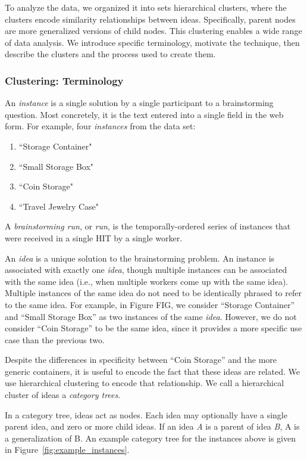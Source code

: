 To analyze the data, we organized it into sets hierarchical clusters, where the clusters encode similarity relationships between ideas. Specifically, parent nodes are more generalized versions of child nodes. This clustering enables a wide range of data analysis. We introduce specific terminology, motivate the technique, then describe the clusters and the process used to create them.

\subsubsection{Clustering: Terminology}
An \emph{instance} is a single solution by a single participant to a brainstorming question. Most concretely, it is the text entered into a single field in the web form. For example, four \emph{instances} from the data set:

\begin{enumerate}
    \item ``Storage Container"
    \item ``Small Storage Box"
    \item ``Coin Storage"
    \item ``Travel Jewelry Case"
\end{enumerate}

A \emph{brainstorming run}, or \emph{run}, is the temporally-ordered series of instances that were received in a single HIT by a single worker.

An \emph{idea} is a unique solution to the brainstorming problem. An instance is associated with exactly one \emph{idea}, though multiple instances can be associated with the same idea (i.e., when multiple workers come up with the same idea). Multiple instances of the same idea do not need to be identically phrased to refer to the same idea. For example, in Figure FIG, we consider ``Storage Container'' and ``Small Storage Box'' as two instances of the same \emph{idea}. However, we do not consider ``Coin Storage'' to be the same idea, since it provides a more specific use case than the previous two.

Despite the differences in specificity between ``Coin Storage'' and the more generic containers, it is useful to encode the fact that these ideas are related. We use hierarchical clustering to encode that relationship. We call a hierarchical cluster of ideas a \emph{category trees}.

In a category tree, ideas act as nodes. Each idea may optionally have a single parent idea, and zero or more child ideas. If an idea \emph{A} is a parent of idea \emph{B}, A is a generalization of B. An example category tree for the instances above is given in Figure~\ref{fig:example_instances}.

